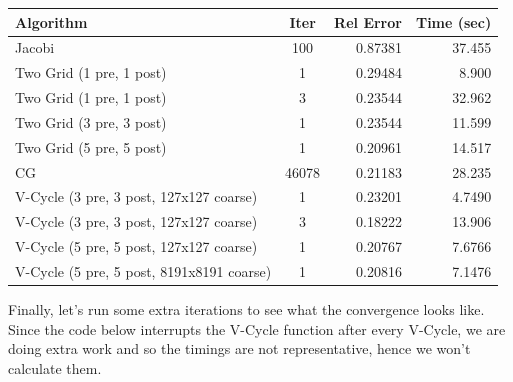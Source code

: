 \documentclass[11pt]{article}
\begin{document}
\begin{center}    
\begin{tabular}{lcrr}
  Algorithm & Iter & Rel Error & Time (sec) \\
  \hline
  Jacobi                                    & 100   &  0.87381  & 37.455 \\
  Two Grid (1 pre, 1 post)                  & 1	    &  0.29484  &  8.900 \\
  Two Grid (1 pre, 1 post)                  & 3	    &  0.23544  & 32.962 \\
  Two Grid (3 pre, 3 post)                  & 1	    &  0.23544  & 11.599 \\
  Two Grid (5 pre, 5 post)                  & 1     &  0.20961  & 14.517 \\
  CG                                        & 46078 &  0.21183  & 28.235 \\
  V-Cycle (3 pre, 3 post, 127x127 coarse)   & 1     &  0.23201  & 4.7490 \\
  V-Cycle (3 pre, 3 post, 127x127 coarse)   & 3     &  0.18222  & 13.906 \\
  V-Cycle (5 pre, 5 post, 127x127 coarse)   & 1     &  0.20767  & 7.6766 \\
  V-Cycle (5 pre, 5 post, 8191x8191 coarse) & 1     &  0.20816  & 7.1476
\end{tabular}
\end{center}

    
    Finally, let's run some extra iterations to see what the convergence
looks like. Since the code below interrupts the V-Cycle function after
every V-Cycle, we are doing extra work and so the timings are not
representative, hence we won't calculate them.
\end{document}
